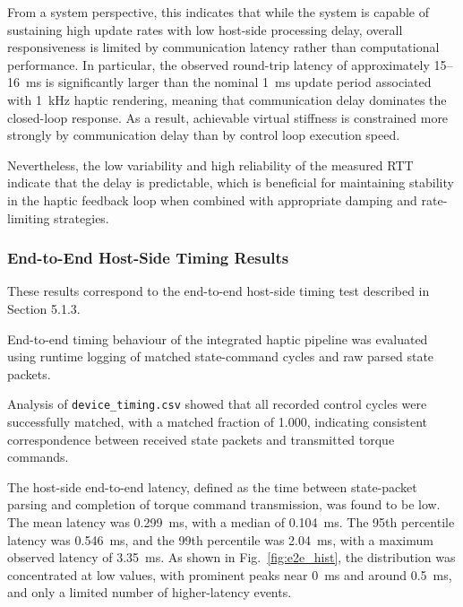 From a system perspective, this indicates that while the system is capable of sustaining high update rates with low host-side processing delay, overall responsiveness is limited by communication latency rather than computational performance. In particular, the observed round-trip latency of approximately 15--16~ms is significantly larger than the nominal 1~ms update period associated with 1~kHz haptic rendering, meaning that communication delay dominates the closed-loop response. As a result, achievable virtual stiffness is constrained more strongly by communication delay than by control loop execution speed.

Nevertheless, the low variability and high reliability of the measured RTT indicate that the delay is predictable, which is beneficial for maintaining stability in the haptic feedback loop when combined with appropriate damping and rate-limiting strategies.


\subsubsection{End-to-End Host-Side Timing Results}
These results correspond to the end-to-end host-side timing test described in Section 5.1.3.

End-to-end timing behaviour of the integrated haptic pipeline was evaluated using runtime logging of matched state-command cycles and raw parsed state packets.

Analysis of \texttt{device\_timing.csv} showed that all recorded control cycles were successfully matched, with a matched fraction of 1.000, indicating consistent correspondence between received state packets and transmitted torque commands.

The host-side end-to-end latency, defined as the time between state-packet parsing and completion of torque command transmission, was found to be low. The mean latency was 0.299~ms, with a median of 0.104~ms. The 95th percentile latency was 0.546~ms, and the 99th percentile was 2.04~ms, with a maximum observed latency of 3.35~ms. As shown in Fig.~\ref{fig:e2e_hist}, the distribution was concentrated at low values, with prominent peaks near 0~ms and around 0.5~ms, and only a limited number of higher-latency events.

